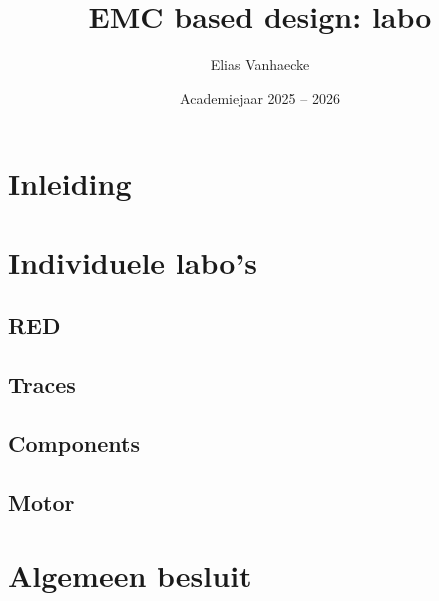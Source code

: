 \documentclass[twoside,kul]{kulakreport} %
\title{EMC based design: labo}
\subtitle{}
\author{Elias Vanhaecke}
\date{Academiejaar 2025 -- 2026}
\institute{Industriële ingenieurswetenschappen, optie smart electronics and software}
\begin{document}
	
	\titlepage
	
	\tableofcontents
	
	\chapter*{Inleiding}



	\chapter{Individuele labo's}
	\section{RED}

	\section{Traces}

	\section{Components}

	\section{Motor}


	\chapter*{Algemeen besluit}
	
\end{document}
